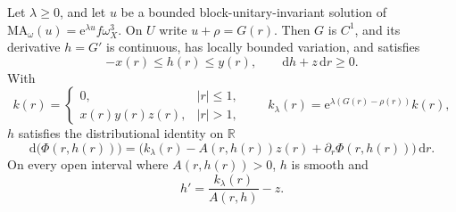 \begin{lemma}\label{lem:numa-radial-flux}
Let $\lambda\geq0$, and let $u$ be a bounded block-unitary-invariant solution of $\mathrm{MA}_\omega(u)=\mathrm{e}^{\lambda u}f\omega_X^3$. On $U$ write $u+\rho=G(r)$. Then $G$ is $C^1$, and its derivative $h=G'$ is continuous, has locally bounded variation, and satisfies
\[
 -x(r)\leq h(r)\leq y(r),\qquad \mathrm{d}h+z\,\mathrm{d}r\geq0.
\]
With
\[
 k(r)=\begin{cases}0,&|r|\leq1,\\x(r)y(r)z(r),&|r|>1,\end{cases}
 \qquad
 k_\lambda(r)=\mathrm{e}^{\lambda(G(r)-\rho(r))}k(r),
\]
$h$ satisfies the distributional identity on $\mathbb R$
\begin{equation}\label{eq:numa-flux-identity}
 \mathrm{d}\bigl(\Phi(r,h(r))\bigr)
 =\bigl(k_\lambda(r)-A(r,h(r))z(r)
                    +\partial_r\Phi(r,h(r))\bigr)\,\mathrm{d}r.
\end{equation}
On every open interval where $A(r,h(r))>0$, $h$ is smooth and
\[
 h'=\frac{k_\lambda(r)}{A(r,h)}-z.
\]
\end{lemma}
